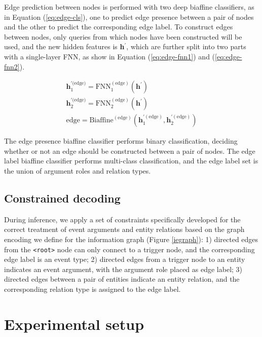\documentclass[11pt]{article}
\begin{document}
Edge prediction between nodes is performed with two deep biaffine classifiers, as in Equation (\ref{eq:edge-cls}), one to predict edge presence between a pair of nodes and the other to predict the corresponding edge label. To construct edges between nodes, only queries from which nodes have been constructed will be used, and the new hidden features is \textbf{h}$^\prime$, which are further split into two parts with a single-layer FNN, as show in Equation (\ref{eq:edge-fnn1}) and (\ref{eq:edge-fnn2}).

{\footnotesize
\begin{gather}
    \label{eq:edge-fnn1}
    \mathrm{\textbf{h}}^{\prime (\mathrm{edge)}}_1 = \mathrm{FNN}^{(\mathrm{edge})}_1(\mathrm{\textbf{h}}^{\prime}) \\
    \label{eq:edge-fnn2}
    \mathrm{\textbf{h}}^{\prime (\mathrm{edge)}}_2 = \mathrm{FNN}^{(\mathrm{edge})}_2(\mathrm{\textbf{h}}^{\prime}) \\
    \label{eq:edge-cls}
    \mathrm{edge} =  \mathrm{Biaffine}^{\mathrm{(edge)}} (\mathrm{\textbf{h}}^{\prime (\mathrm{edge})}_1, \mathrm{\textbf{h}}^{\prime (\mathrm{edge})}_2) 
\end{gather}
}

 The edge presence biaffine classifier performs binary classification, deciding whether or not an edge should be constructed between a pair of nodes. The edge label biaffine classifier performs multi-class classification, and the edge label set is the union of argument roles and relation types.

 \subsection{Constrained decoding}
 
 During inference, we apply a set of  constraints specifically developed for the  correct treatment of event arguments and entity relations based on the graph encoding we define for the information graph (Figure \ref{iegraph}): 1) directed edges from the \texttt{<root>} node can only connect to a trigger node, and the corresponding edge label is an event type; 2) directed edges from a trigger node to an entity indicates an event argument, with the argument role placed as edge label; 3) directed edges between a pair of entities indicate an entity relation, and the corresponding relation type is assigned to the edge label. 

\section{Experimental setup}
\label{sec:exp}
\end{document}
